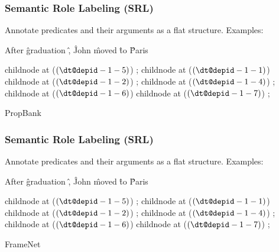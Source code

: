 \documentclass[t]{beamer}
\begin{document}
\begin{frame}
\frametitle{Semantic Role Labeling (SRL)}
Annotate predicates and their arguments as a flat structure.
Examples:

\centering
\vfill
\begin{dependency}
	\begin{deptext}[column sep=1.5em,ampersand replacement=\^]
	After \^ graduation \^ , \^ John \^ moved \^ to \^ Paris \\
	\end{deptext}
	child{node at ($(\wordref{1}{5})$) {}};
	child{node at ($(\wordref{1}{1})$) {}}
	child{node at ($(\wordref{1}{2})$) {}};
	child{node at ($(\wordref{1}{4})$) {}};
	child{node at ($(\wordref{1}{6})$) {}}
	child{node at ($(\wordref{1}{7})$) {}};
\end{dependency}

\vfill
{\color{blue} PropBank}
\end{frame}

\begin{frame}
\frametitle{Semantic Role Labeling (SRL)}
Annotate predicates and their arguments as a flat structure.
Examples:

\centering
\vfill
\begin{dependency}
	\begin{deptext}[column sep=1.5em,ampersand replacement=\^]
	After \^ graduation \^ , \^ John \^ moved \^ to \^ Paris \\
	\end{deptext}
	child{node at ($(\wordref{1}{5})$) {}};
	child{node at ($(\wordref{1}{1})$) {}}
	child{node at ($(\wordref{1}{2})$) {}};
	child{node at ($(\wordref{1}{4})$) {}};
	child{node at ($(\wordref{1}{6})$) {}}
	child{node at ($(\wordref{1}{7})$) {}};
\end{dependency}

\vfill
{\color{red} FrameNet}
\end{frame}
\end{document}
